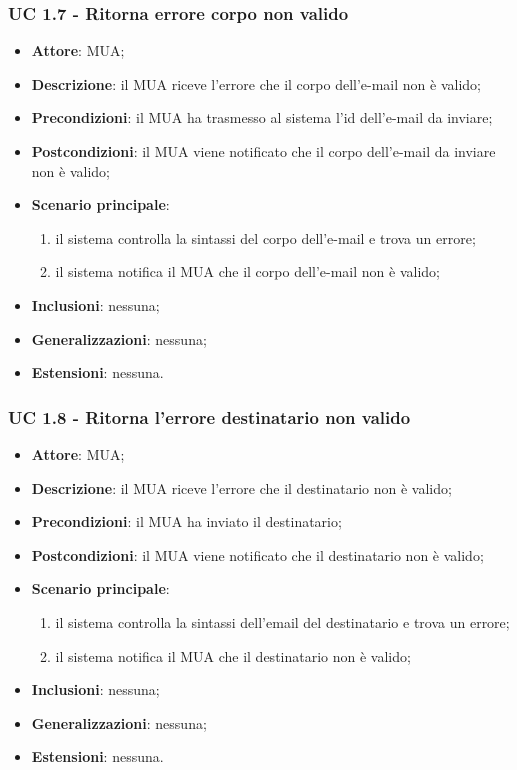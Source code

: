     \subsubsection{UC 1.7 - Ritorna errore corpo non valido} \label{sec:UC1.7}
    \begin{itemize}
        \item \textbf{Attore}: MUA;
        \item \textbf{Descrizione}: il MUA riceve l'errore che il corpo dell'e-mail non è valido;
        \item \textbf{Precondizioni}: il MUA ha trasmesso al sistema l'id dell'e-mail da inviare;
        \item \textbf{Postcondizioni}: il MUA viene notificato che il corpo dell'e-mail da inviare non è valido;
        \item \textbf{Scenario principale}:
            \begin{enumerate}
                \item il sistema controlla la sintassi del corpo dell'e-mail e trova un errore;
                \item il sistema notifica il MUA che il corpo dell'e-mail non è valido;
            \end{enumerate}
        \item \textbf{Inclusioni}: nessuna;
        \item \textbf{Generalizzazioni}: nessuna;
        \item \textbf{Estensioni}: nessuna.
    \end{itemize}



    \subsubsection{UC 1.8 - Ritorna l'errore destinatario non valido} \label{sec:UC1.8}
    \begin{itemize}
        \item \textbf{Attore}: MUA;
        \item \textbf{Descrizione}: il MUA riceve l'errore che il destinatario non è valido;
        \item \textbf{Precondizioni}: il MUA ha inviato il destinatario;
        \item \textbf{Postcondizioni}: il MUA viene notificato che il destinatario non è valido;
        \item \textbf{Scenario principale}:
            \begin{enumerate}
                \item il sistema controlla la sintassi dell'email del destinatario e trova un errore;
                \item il sistema notifica il MUA che il destinatario non è valido;
            \end{enumerate}
        \item \textbf{Inclusioni}: nessuna;
        \item \textbf{Generalizzazioni}: nessuna;
        \item \textbf{Estensioni}: nessuna.
    \end{itemize}


